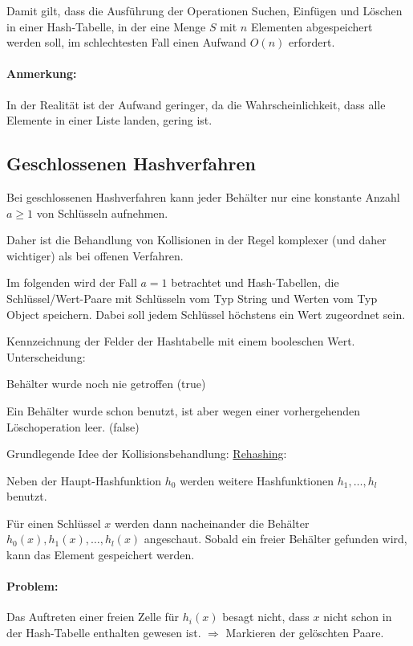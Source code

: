 Damit gilt, dass die Ausführung der Operationen Suchen, Einfügen und Löschen in einer Hash-Tabelle, in der eine Menge $S$ mit $n$ Elementen abgespeichert werden soll, im schlechtesten Fall einen Aufwand $O(n)$ erfordert.

\paragraph{Anmerkung:} In der Realität ist der Aufwand geringer, da die Wahrscheinlichkeit, dass alle Elemente in einer Liste {\flqq landen\frqq}, gering ist.

\subsection{Geschlossenen Hashverfahren}
Bei geschlossenen Hashverfahren kann jeder Behälter nur eine konstante Anzahl $a \ge 1$ von Schlüsseln aufnehmen.

Daher ist die Behandlung von Kollisionen in der Regel komplexer (und daher wichtiger) als bei offenen Verfahren.

Im folgenden wird der Fall $a = 1$ betrachtet und Hash-Tabellen, die Schlüssel/Wert-Paare mit Schlüsseln vom Typ String und Werten vom Typ Object speichern. Dabei soll jedem Schlüssel höchstens ein Wert zugeordnet sein.

Kennzeichnung der Felder der Hashtabelle mit einem booleschen Wert. Unterscheidung:
\begin{compactitem}
	\item Behälter wurde noch nie getroffen (true)
	\item Ein Behälter wurde schon benutzt, ist aber wegen einer vorhergehenden Löschoperation leer. (false)
\end{compactitem}

Grundlegende Idee der Kollisionsbehandlung: \ul{Rehashing}:
\begin{compactitem}
	\item Neben der {\flqq Haupt\frqq}-Hashfunktion $h_0$ werden weitere Hashfunktionen $h_1, \ldots, h_l$ benutzt.
	\item Für einen Schlüssel $x$ werden dann nacheinander die Behälter $h_0(x), h_1(x), \ldots, h_l(x)$ angeschaut. Sobald ein freier Behälter gefunden wird, kann das Element gespeichert werden.
\end{compactitem}

\paragraph{Problem:} Das Auftreten einer freien Zelle für $h_i(x)$ besagt nicht, dass $x$ nicht schon in der Hash-Tabelle enthalten gewesen ist. $\Rightarrow$ Markieren der gelöschten Paare.

